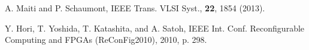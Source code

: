 \documentclass[%
reprint, amsmath,amssymb,%
pra,
]{revtex4-1}
\begin{document}
\begin{thebibliography}{99}
A. Maiti and P. Schaumont, 
IEEE Trans. VLSI Syst., {\bf 22}, 1854 (2013).

Y. Hori, T. Yoshida, T. Katashita, and A. Satoh, 
IEEE Int. Conf. Reconfigurable Computing and FPGAs (ReConFig2010), 2010, p. 298.


\end{thebibliography}
\end{document}
